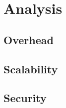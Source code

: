 \chapter{Analysis}
\label{ch:analysis}


\section{Overhead}
\label{sec:analysis:overhead}

\section{Scalability}
\label{sec:analysis:scalability}

\section{Security}
\label{sec:analysis:security}
